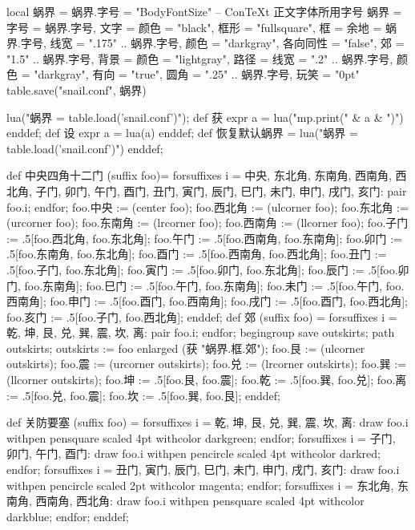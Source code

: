 \startluacode
local 蜗界 = {}
蜗界.字号 = "BodyFontSize" -- ConTeXt 正文字体所用字号
蜗界 = {
    字号 = 蜗界.字号,
    文字 = {颜色 = "black"},
    框形 = "fullsquare",
    框 = {余地 = 蜗界.字号, 
          线宽 = ".175" .. 蜗界.字号, 
          颜色 = "darkgray",
          各向同性 = "false",
          郊 = "1.5" .. 蜗界.字号},
    背景 = {颜色 = "lightgray"},
    路径 = {线宽 = ".2" .. 蜗界.字号,
            颜色 = "darkgray",
            有向 = "true",
            圆角 = ".25" .. 蜗界.字号},
    玩笑 = "0pt"
}
table.save("snail.conf", 蜗界)
\stopluacode

\startMPinclusions
lua("蜗界 = table.load('snail.conf')");
def 获 expr a = lua("mp.print(" & a & ")") enddef;
def 设 expr a = lua(a) enddef;
def 恢复默认蜗界 =
  lua("蜗界 = table.load('snail.conf')")
enddef;
\stopMPinclusions

\startMPinclusions[+]
def 中央四角十二门 (suffix foo)= 
  forsuffixes i = 中央, 东北角, 东南角, 西南角, 西北角,
                  子门, 卯门, 午门, 酉门,
                  丑门, 寅门, 辰门, 巳门, 未门, 申门, 戌门, 亥门:
    pair foo.i;
  endfor;
  foo.中央 := (center foo);
  foo.西北角 := (ulcorner foo); 
  foo.东北角 := (urcorner foo);
  foo.东南角 := (lrcorner foo);
  foo.西南角 := (llcorner foo);
  foo.子门 := .5[foo.西北角, foo.东北角];
  foo.午门 := .5[foo.西南角, foo.东南角];
  foo.卯门 := .5[foo.东南角, foo.东北角];
  foo.酉门 := .5[foo.西南角, foo.西北角];
  foo.丑门 := .5[foo.子门, foo.东北角];
  foo.寅门 := .5[foo.卯门, foo.东北角];
  foo.辰门 := .5[foo.卯门, foo.东南角];
  foo.巳门 := .5[foo.午门, foo.东南角];
  foo.未门 := .5[foo.午门, foo.西南角];
  foo.申门 := .5[foo.酉门, foo.西南角];
  foo.戌门 := .5[foo.酉门, foo.西北角];
  foo.亥门 := .5[foo.子门, foo.西北角];
enddef;
def 郊 (suffix foo) = 
  forsuffixes i = 乾, 坤, 艮, 兑, 巽, 震, 坎, 离:
    pair foo.i;
  endfor;
  begingroup
    save outskirts; path outskirts;
  outskirts := foo enlarged (获 "蜗界.框.郊");
  foo.艮 := (ulcorner outskirts); 
  foo.震 := (urcorner outskirts);
  foo.兑 := (lrcorner outskirts);
  foo.巽 := (llcorner outskirts);
  foo.坤 := .5[foo.艮, foo.震];
  foo.乾 := .5[foo.巽, foo.兑];
  foo.离 := .5[foo.兑, foo.震];
  foo.坎 := .5[foo.巽, foo.艮];
enddef;

def 关防要塞 (suffix foo) =
  forsuffixes i = 乾, 坤, 艮, 兑, 巽, 震, 坎, 离:
    draw foo.i withpen pensquare scaled 4pt withcolor darkgreen;
  endfor;
  forsuffixes i = 子门, 卯门, 午门, 酉门:
    draw foo.i withpen pencircle scaled 4pt withcolor darkred;
  endfor;
  forsuffixes i = 丑门, 寅门, 辰门, 巳门, 未门, 申门, 戌门, 亥门:
    draw foo.i withpen pencircle scaled 2pt withcolor magenta;
  endfor;
 forsuffixes i = 东北角, 东南角, 西南角, 西北角:
   draw foo.i withpen pensquare scaled 4pt withcolor darkblue;
 endfor;
enddef;
\stopMPinclusions

